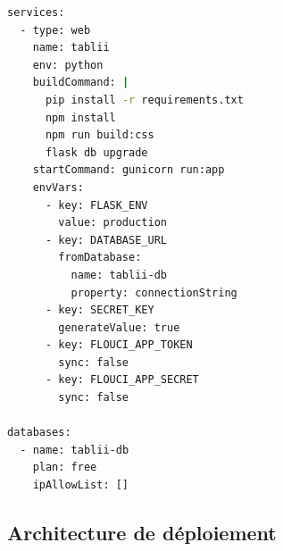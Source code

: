 \documentclass[12pt,a4paper]{report}
\begin{document}
\begin{codebox}
\begin{lstlisting}[language=bash]
services:
  - type: web
    name: tablii
    env: python
    buildCommand: |
      pip install -r requirements.txt
      npm install
      npm run build:css
      flask db upgrade
    startCommand: gunicorn run:app
    envVars:
      - key: FLASK_ENV
        value: production
      - key: DATABASE_URL
        fromDatabase:
          name: tablii-db
          property: connectionString
      - key: SECRET_KEY
        generateValue: true
      - key: FLOUCI_APP_TOKEN
        sync: false
      - key: FLOUCI_APP_SECRET
        sync: false

databases:
  - name: tablii-db
    plan: free
    ipAllowList: []
\end{lstlisting}
\end{codebox}

\subsection{Architecture de déploiement}
\end{document}
